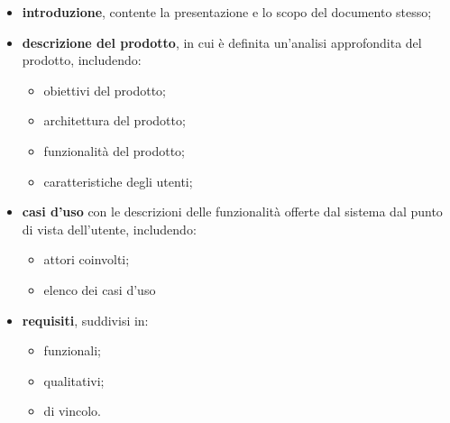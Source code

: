 \begin{itemize}
	\item \textbf{introduzione}, contente la presentazione e lo scopo del documento stesso;
	\item \textbf{descrizione del prodotto}, in cui è definita un'analisi approfondita del prodotto, includendo:
	      \begin{itemize}
		      \item obiettivi del prodotto;
		      \item architettura del prodotto;
		      \item funzionalità del prodotto;
		      \item caratteristiche degli utenti;
	      \end{itemize}
	\item \textbf{casi d'uso} con le descrizioni delle funzionalità offerte dal sistema dal punto di vista dell'utente, includendo:
	      \begin{itemize}
		      \item attori coinvolti;
		      \item elenco dei casi d'uso
	      \end{itemize}
	\item \textbf{requisiti}, suddivisi in:
	      \begin{itemize}
		      \item funzionali;
		      \item qualitativi;
		      \item di vincolo.
	      \end{itemize}
\end{itemize}

